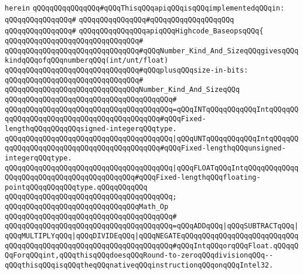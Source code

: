 \verb|herein|\newline
\newline
\verb|qQQqqQQqqQQqqQQq#qQQqThisqQQqapiqQQqisqQQqimplementedqQQqin:|\newline
\verb|qQQqqQQqqQQqqQQq#|\newline
\verb|qQQqqQQqqQQqqQQq#qQQqqQQqqQQqqQQqqQQq|\newline
\verb|qQQqqQQqqQQqqQQq#|\newline
\verb|qQQqqQQqqQQqqQQqapiqQQqHighcode_BaseopsqQQq{|\newline
\verb|qQQqqQQqqQQqqQQqqQQqqQQqqQQqqQQq#|\newline
\newline
\verb|qQQqqQQqqQQqqQQqqQQqqQQqqQQqqQQq#qQQqNumber_Kind_And_SizeqQQqgivesqQQqkindqQQqofqQQqnumberqQQq(int/unt/float)|\newline
\verb|qQQqqQQqqQQqqQQqqQQqqQQqqQQqqQQq#qQQqplusqQQqsize-in-bits:|\newline
\verb|qQQqqQQqqQQqqQQqqQQqqQQqqQQqqQQq#|\newline
\verb|qQQqqQQqqQQqqQQqqQQqqQQqqQQqqQQqNumber_Kind_And_SizeqQQq|\newline
\verb|qQQqqQQqqQQqqQQqqQQqqQQqqQQqqQQqqQQqqQQq#|\newline
\verb|qQQqqQQqqQQqqQQqqQQqqQQqqQQqqQQqqQQqqQQq=qQQqINTqQQqqQQqqQQqIntqQQqqQQqqQQqqQQqqQQqqQQqqQQqqQQqqQQqqQQqqQQq#qQQqFixed-lengthqQQqqQQqqQQqsigned-integerqQQqtype.|\newline
\verb|qQQqqQQqqQQqqQQqqQQqqQQqqQQqqQQqqQQqqQQq|\verb#|qQQqUNTqQQqqQQqqQQqIntqQQqqQQqqQQqqQQqqQQqqQQqqQQqqQQqqQQqqQQqqQQq#\verb|#qQQqFixed-lengthqQQqunsigned-integerqQQqtype.|\newline
\verb|qQQqqQQqqQQqqQQqqQQqqQQqqQQqqQQqqQQqqQQq|\verb#|qQQqFLOATqQQqIntqQQqqQQqqQQqqQQqqQQqqQQqqQQqqQQqqQQqqQQqqQQq#\verb|#qQQqFixed-lengthqQQqfloating-pointqQQqqQQqqQQqtype.qQQqqQQqqQQq|\newline
\verb|qQQqqQQqqQQqqQQqqQQqqQQqqQQqqQQqqQQqqQQq;|\newline
\newline
\verb|qQQqqQQqqQQqqQQqqQQqqQQqqQQqqQQqMath_Op|\newline
\verb|qQQqqQQqqQQqqQQqqQQqqQQqqQQqqQQqqQQqqQQq#|\newline
\verb|qQQqqQQqqQQqqQQqqQQqqQQqqQQqqQQqqQQqqQQq=qQQqADDqQQq|\verb#|qQQqSUBTRACTqQQq|qQQqMULTIPLYqQQq|qQQqDIVIDEqQQq|qQQqNEGATEqQQqqQQqqQQqqQQqqQQqqQQqqQQqqQQqqQQqqQQqqQQqqQQqqQQqqQQqqQQqqQQqqQQq#\verb|#qQQqIntqQQqorqQQqFloat.qQQqqQQqForqQQqint,qQQqthisqQQqdoesqQQqRound-to-zeroqQQqdivisionqQQq--qQQqthisqQQqisqQQqtheqQQqnativeqQQqinstructionqQQqonqQQqIntel32.|\newline
